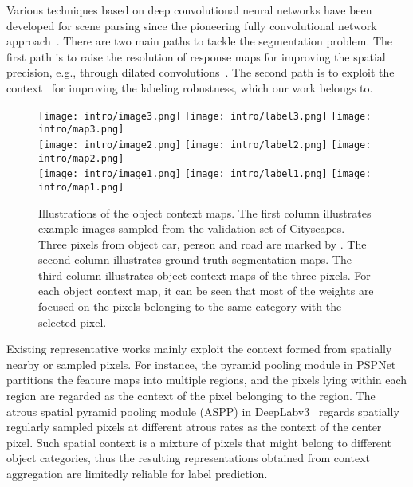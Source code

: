 \documentclass[10pt,twocolumn,letterpaper]{article}
\begin{document}
Various techniques based on deep convolutional neural networks 
have been developed for scene parsing
since the pioneering fully convolutional network approach~\cite{long2015fully}.
There are two main paths to tackle the segmentation problem.
The first path is to raise the resolution
of response maps for improving the spatial precision,
e.g., through dilated convolutions~\cite{chen2018deeplab, yu2015multi}. 
The second path is to exploit the context~\cite{chen2018deeplab, yu2015multi,zhao2017pyramid}
for improving the labeling robustness,
which our work belongs to.

\begin{figure}
\centering
	\texttt{[image: intro/image3.png]}
	\texttt{[image: intro/label3.png]}
	\texttt{[image: intro/map3.png]}\\
	\vspace{.05cm}
	\texttt{[image: intro/image2.png]}
	\texttt{[image: intro/label2.png]}
	\texttt{[image: intro/map2.png]}\\
	\vspace{.05cm}
	\texttt{[image: intro/image1.png]}
	\texttt{[image: intro/label1.png]}
	\texttt{[image: intro/map1.png]}
\caption{\small
Illustrations of the object context maps.
The first column illustrates example images sampled from the validation set of Cityscapes.
Three pixels from object car, person and road are marked by {}.
The second column illustrates ground truth segmentation maps.
The third column illustrates object context maps of the three pixels.
For each object context map,
it can be seen that 
most of the weights are focused on 
the pixels belonging to the same category with the
selected pixel. 
}
\label{fig:ocmap_intro}
\end{figure}

Existing representative works
mainly exploit the context
formed from spatially nearby or sampled pixels.
For instance, the pyramid pooling module in PSPNet~\cite{zhao2017pyramid} partitions the feature maps
into multiple regions,
and the pixels lying within each region are regarded as the context
of the pixel belonging to the region.
The atrous spatial pyramid pooling module (ASPP) in DeepLabv3~\cite{chen2017rethinking} 
regards spatially regularly sampled pixels 
at different atrous rates as
the context of the center pixel.
Such spatial context is a mixture of pixels 
that might belong to different object categories,
thus the resulting representations
obtained from context aggregation
are limitedly reliable for
label prediction.
\end{document}
